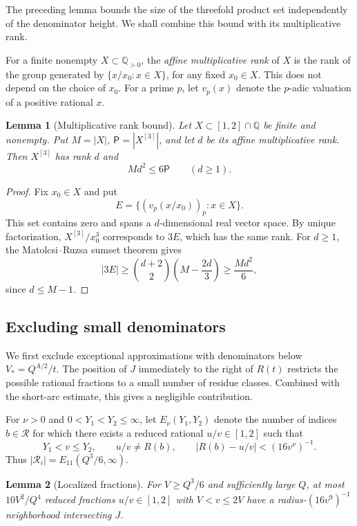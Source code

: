 \documentclass[11pt,reqno]{amsart}
\theoremstyle{definition}
\newcommand{\Q}{\mathbb Q}
\theoremstyle{plain}
\newtheorem{lemma}{Lemma}[section]
\theoremstyle{definition}
\theoremstyle{remark}
\newcommand{\RR}{\mathcal R}
\begin{document}
The preceding lemma bounds the size of the
threefold product set independently of the
denominator height. We shall combine this
bound with its multiplicative rank.

For a finite nonempty $X\subset\Q_{>0}$,
the \emph{affine multiplicative rank} of $X$
is the rank of the group generated by
$\{x/x_0:x\in X\}$, for any fixed $x_0\in X$.
This does not depend on the choice of $x_0$.
For a prime $p$, let $v_p(x)$ denote the
$p$-adic valuation of a positive rational $x$.

\begin{lemma}[Multiplicative rank bound]
\label{lem:rank-height}
Let $X\subset[1,2]\cap\Q$ be finite and
nonempty. Put $M=|X|$, $\mathsf P=|X^{[3]}|$,
and let $d$ be its affine multiplicative rank.
Then $X^{[3]}$ has rank $d$ and
\begin{equation}\label{eq:rank120}
 Md^2\le6\mathsf P\qquad(d\ge1).
\end{equation}
\end{lemma}

\begin{proof}
Fix $x_0\in X$ and put
\[
 E=\{(v_p(x/x_0))_p:x\in X\}.
\]
This set contains zero and spans a
$d$-dimensional real vector space.
By unique factorization, $X^{[3]}/x_0^3$
corresponds to $3E$, which has the same
rank. For $d\ge1$, the Matolcsi--Ruzsa
sumset theorem \cite[Theorem~1.5]{MR}
gives
\[
 |3E|\ge\binom{d+2}{2}
 \left(M-\frac{2d}{3}\right)
 \ge\frac{Md^2}{6},
\]
since $d\le M-1$.
\end{proof}



\subsection{Excluding small denominators}
\label{sec:lower}

We first exclude exceptional approximations with denominators
below $V_*=Q^{A/2}/t$. The position of $J$ immediately to the
right of $R(t)$ restricts the possible rational fractions to
a small number of residue classes. Combined with the short-arc
estimate, this gives a negligible contribution.

For $\nu>0$ and $0<Y_1<Y_2\le\infty$, let
$E_\nu(Y_1,Y_2)$ denote the number of indices $b\in\RR$
for which there exists a reduced rational $u/v\in[1,2]$
such that
\[
 Y_1<v\le Y_2,\qquad u/v\ne R(b),\qquad
 |R(b)-u/v|<(16v^\nu)^{-1}.
\]
Thus $|\RR_i|=E_{11}(Q^3/6,\infty)$.

\begin{lemma}[Localized fractions]
\label{lem:localized-targets}
For $V\ge Q^3/6$ and sufficiently large $Q$, at most
$10V^2/Q^4$ reduced fractions $u/v\in[1,2]$ with
$V<v\le2V$ have a radius-$(16v^9)^{-1}$ neighborhood
intersecting $J$.
\end{lemma}
\end{document}
